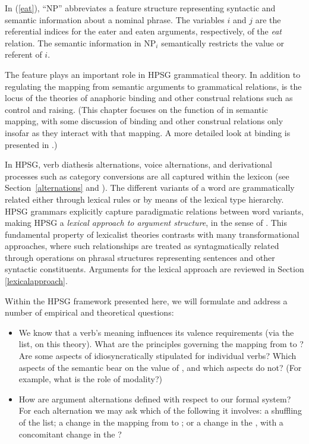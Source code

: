 \documentclass[output=paper
	        ,collection
	        ,collectionchapter
 	        ,biblatex
                ,babelshorthands
                ,newtxmath
                ,draftmode
                ,colorlinks, citecolor=brown
]{langscibook}
\begin{document}
	
\noindent
In (\ref{eat}), ``NP'' abbreviates a feature structure representing syntactic and semantic information about a nominal phrase.  The variables $i$ and 
$j$ are the referential indices for the eater and eaten arguments, respectively, of the \textit{eat} relation.  The semantic information in 
NP$_i$ semantically restricts the value or referent of $i$. 

The \argst feature plays an important  
role in HPSG grammatical theory.  In addition to regulating the mapping from semantic arguments to grammatical relations, \argst is the locus of the theories of anaphoric binding and other construal relations such as control and raising.  (This chapter focuses on the function of \argst  in semantic mapping, with some discussion of binding and other construal relations only insofar as they interact with that mapping.  A more detailed look at binding is presented in .)   

In HPSG, verb diathesis alternations, voice alternations, and derivational processes such as category conversions are all captured within the lexicon (see Section~\ref{alternations} and ).  The different variants of a word are grammatically related either through lexical rules or by means of the lexical type hierarchy.  HPSG grammars explicitly capture paradigmatic relations between word variants, making HPSG a \textit{lexical approach to argument structure}, in the sense of \citet{MWArgSt}.
This fundamental property of lexicalist theories contrasts with many transformational approaches, where such relationships are treated as syntagmatically related through operations on phrasal structures representing sentences and other syntactic constituents.  Arguments for the lexical approach are reviewed in Section \ref{lexicalapproach}.  

Within the HPSG framework presented here, we will formulate and address a number of empirical and theoretical questions: 

\begin{itemize}
\item We know that a verb's meaning influences its valence requirements (via the \argst list, on this theory). 
 What are the principles governing the mapping from \content to \argst ?  Are some aspects of \argst idiosyncratically stipulated for individual verbs?  Which aspects of the semantic \content  bear on the value of \argst, and which aspects do not?  (For example, what is the role of modality?)  
\item How are argument alternations defined with respect to our formal system?  For each alternation we may ask which of the following it involves: a shuffling of the \argst list;  a change in the mapping from \argst to \val; or  a change in the \content, with a concomitant change in the \argst?  
\end{itemize}
\end{document}
